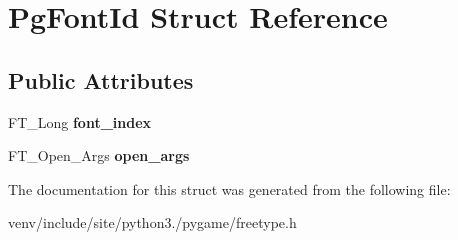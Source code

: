\hypertarget{struct_pg_font_id}{}\section{Pg\+Font\+Id Struct Reference}
\label{struct_pg_font_id}
\subsection*{Public Attributes}
\begin{DoxyCompactItemize}
\item 
\mbox{\label{struct_pg_font_id_add7c07b0b7a4ce1f3a1bcfd801f793c2}} 
F\+T\+\_\+\+Long {\bfseries font\+\_\+index}
\item 
\mbox{\label{struct_pg_font_id_a12d0edd3ce86c569f77acfdd3bb9762c}} 
F\+T\+\_\+\+Open\+\_\+\+Args {\bfseries open\+\_\+args}
\end{DoxyCompactItemize}


The documentation for this struct was generated from the following file\+:\begin{DoxyCompactItemize}
\item 
venv/include/site/python3./pygame/freetype.\+h\end{DoxyCompactItemize}
